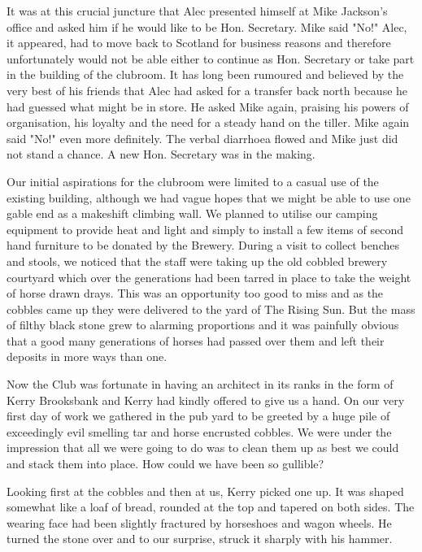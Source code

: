 \documentclass[a5paper,openany,font 10pt]{scrbook}
\begin{document}
It was at this crucial juncture that Alec presented himself
at Mike Jackson's office and asked him if he would like to be
Hon. Secretary. Mike said "No!"  Alec, it appeared, had to move
back to Scotland for business reasons and therefore unfortunately
would not be able either to continue as Hon. Secretary or take
part in the building of the clubroom. It has long been rumoured
 and believed by the very best of his friends  that Alec had
asked for a transfer back north because he had guessed what might
be in store. He asked Mike again, praising his powers of
organisation, his loyalty and the need for a steady hand on the
tiller. Mike again said "No!"   even more definitely. The verbal
diarrhoea flowed and Mike just did not stand a chance. A new Hon.
Secretary was in the making.

Our initial aspirations for the clubroom were limited to a
casual use of the existing building, although we had vague hopes
that we might be able to use one gable end as a makeshift
climbing wall. We planned to utilise our camping equipment to
provide heat and light and simply to install a few items of
second hand furniture to be donated by the Brewery. During a
visit to collect benches and stools, we noticed that the staff
were taking up the old cobbled brewery courtyard which over the
generations had been tarred in place to take the weight of horse
drawn drays. This was an opportunity too good to miss and as the
cobbles came up they were delivered to the yard of The Rising
Sun. But the mass of filthy black stone grew to alarming
proportions and it was painfully obvious that a good many
generations of horses had passed over them and left their
deposits in more ways than one.

Now the Club was fortunate in having an architect in its
ranks in the form of Kerry Brooksbank and Kerry had kindly
offered to give us a hand. On our very first day of work we
gathered in the pub yard to be greeted by a huge pile of
exceedingly evil smelling tar and horse encrusted cobbles. We
were under the impression that all we were going to do was to
clean them up as best we could and stack them into place. How
could we have been so gullible?

Looking first at the cobbles and then at us, Kerry picked
one up. It was shaped somewhat like a loaf of bread, rounded at
the top and tapered on both sides. The wearing face had been
slightly fractured by horseshoes and wagon wheels. He turned the
stone over and to our surprise, struck it sharply with his
hammer.
\end{document}
